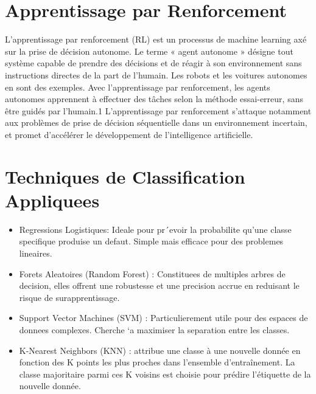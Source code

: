 \section{Apprentissage par Renforcement}
\label{sec:renforcement}
L’apprentissage par renforcement (RL) est un processus de machine learning axé sur la prise de décision autonome. Le terme « agent autonome » désigne tout système capable de prendre des décisions et de réagir à son environnement sans instructions directes de la part de l’humain. Les robots et les voitures autonomes en sont des exemples. Avec l’apprentissage par renforcement, les agents autonomes apprennent à effectuer des tâches selon la méthode essai-erreur, sans être guidés par l’humain.1 L’apprentissage par renforcement s’attaque notamment aux problèmes de prise de décision séquentielle dans un environnement incertain, et promet d’accélérer le développement de l’intelligence artificielle.

\section{Techniques de Classification Appliquees}
\label{sec:Techniques}

\begin{itemize}
    \item Regressions Logistiques: Ideale pour pr´evoir la probabilite qu’une classe specifique produise un defaut. Simple mais efficace pour des problemes
lineaires.
    \item Forets Aleatoires (Random Forest) : Constituees de multiples arbres de decision, elles offrent une robustesse et une precision accrue en reduisant le risque de surapprentissage.
    \item Support Vector Machines (SVM) : Particulierement utile pour des espaces de donnees complexes. Cherche `a maximiser la separation entre les classes.
    \item K-Nearest Neighbors (KNN) : attribue une classe à une nouvelle donnée en fonction des K points les plus proches dans l’ensemble d’entraînement. La classe majoritaire parmi ces K voisins est choisie pour prédire l’étiquette de la nouvelle donnée.

\end{itemize}
